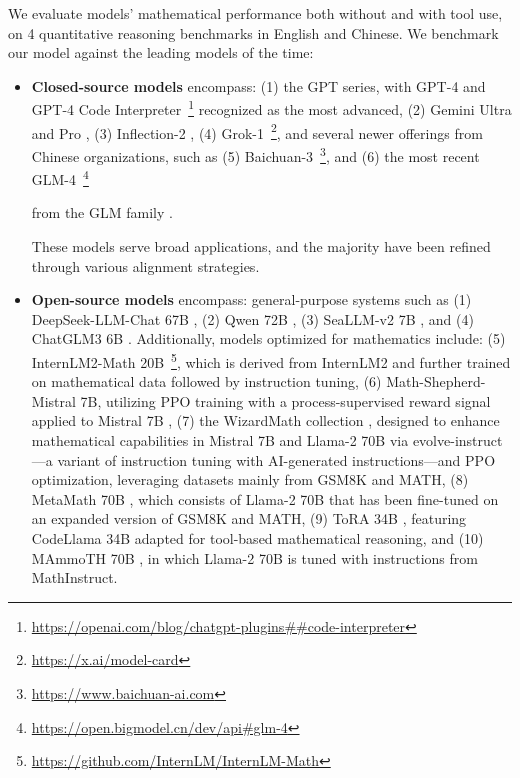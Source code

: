 \begin{itemize}[topsep=0pt]
We evaluate models' mathematical performance both without and with tool use, on 4 quantitative reasoning benchmarks in English and Chinese. We benchmark our model against the leading models of the time:

\begin{itemize}[topsep=0pt]
    \item \textbf{Closed-source models} encompass: (1) the GPT series, with GPT-4 \citep{gpt4} and GPT-4 Code Interpreter~\footnote{\url{https://openai.com/blog/chatgpt-plugins\#\#code-interpreter}} recognized as the most advanced, (2) Gemini Ultra and Pro \citep{gemini}, (3) Inflection-2 \citep{inflection-2}, (4) Grok-1~\footnote{\url{https://x.ai/model-card}},
    and several newer offerings from Chinese organizations, such as (5) Baichuan-3~\footnote{\url{https://www.baichuan-ai.com}},
    and (6) the most recent GLM-4~\footnote{\url{https://open.bigmodel.cn/dev/api\#glm-4}}

    from the GLM family \citep{glm}.

These models serve broad applications, and the majority have been refined through various alignment strategies.

\item \textbf{Open-source models} encompass: general-purpose systems such as (1) DeepSeek-LLM-Chat 67B \citep{deepseek-llm}, (2) Qwen 72B \citep{qwen}, (3) SeaLLM-v2 7B \citep{seallm}, and (4) ChatGLM3 6B \citep{chatglm3}. Additionally, models optimized for mathematics include: (5) InternLM2-Math 20B~\footnote{\url{https://github.com/InternLM/InternLM-Math}}, which is derived from InternLM2 and further trained on mathematical data followed by instruction tuning, (6) Math-Shepherd-Mistral 7B, utilizing PPO training \citep{schulman2017proximal} with a process-supervised reward signal applied to Mistral 7B \citep{mistral}, (7) the WizardMath collection \citep{wizardmath}, designed to enhance mathematical capabilities in Mistral 7B and Llama-2 70B \citep{llama2} via evolve-instruct—a variant of instruction tuning with AI-generated instructions—and PPO optimization, leveraging datasets mainly from GSM8K and MATH, (8) MetaMath 70B \citep{metamath}, which consists of Llama-2 70B that has been fine-tuned on an expanded version of GSM8K and MATH, (9) ToRA 34B \cite{tora}, featuring CodeLlama 34B adapted for tool-based mathematical reasoning, and (10) MAmmoTH 70B \citep{MathInstruct}, in which Llama-2 70B is tuned with instructions from MathInstruct.


\end{itemize}
\end{itemize}
